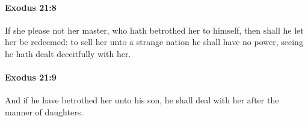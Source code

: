 		\paragraph{Exodus 21:8} %
			\label{EXODUS-21-8}

			If she please not her master, who hath betrothed her to himself, then shall he let her be redeemed: to sell her unto a strange nation he shall have no power, seeing he hath dealt deceitfully with her.


		\paragraph{Exodus 21:9} %
			\label{EXODUS-21-9}

			And if he have betrothed her unto his son, he shall deal with her after the manner of daughters.


